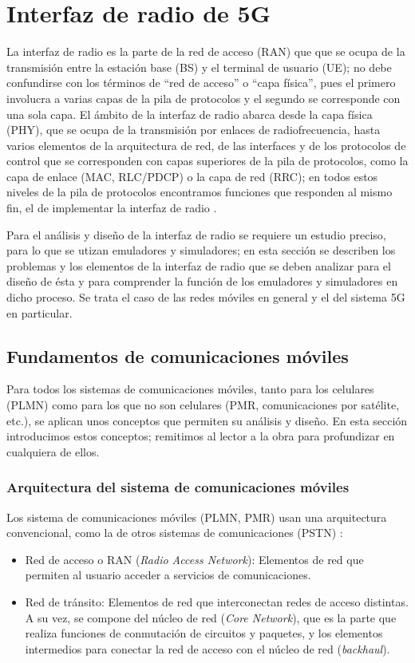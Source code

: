 \documentclass[12pt]{report} %
\begin{document}
\chapter{Interfaz de radio de 5G}

La interfaz de radio es la parte de la red de acceso (RAN) que que se ocupa de la transmisión entre la estación base (BS) y el terminal de usuario (UE);
no debe confundirse con los términos de ``red de acceso'' o ``capa física'',
pues el primero involucra a varias capas de la pila de protocolos y el segundo se corresponde con una sola capa.
El ámbito de la interfaz de radio abarca desde la capa física (PHY), que se ocupa de la transmisión por enlaces de radiofrecuencia,
hasta varios elementos de la arquitectura de red, de las interfaces y de los protocolos de control que  se corresponden con capas superiores de la pila de protocolos, como la capa de enlace (MAC, RLC/PDCP) o la capa de red (RRC);
en todos estos niveles de la pila de protocolos encontramos funciones que responden al mismo fin, el de implementar la interfaz de radio \cite{RefWorks:77}.

Para el análisis y diseño de la interfaz de radio se requiere un estudio preciso, para lo que se utizan emuladores y simuladores;
en esta sección se describen los problemas y los elementos de la interfaz de radio que se deben analizar para el diseño de ésta y para comprender la función de los emuladores y simuladores en dicho proceso.
Se trata el caso de las redes móviles en general y el del sistema 5G en particular.

\section{Fundamentos de comunicaciones móviles}

Para todos los sistemas de comunicaciones móviles, tanto para los celulares (PLMN) como para los que no son celulares (PMR, comunicaciones por satélite, etc.), se aplican unos conceptos que permiten su análisis y diseño.
En esta sección introducimos estos conceptos; remitimos al lector a la obra \cite{RefWorks:17} para profundizar en cualquiera de ellos.

\subsection{Arquitectura del sistema de comunicaciones móviles}

Los sistema de comunicaciones móviles (PLMN, PMR) usan una arquitectura convencional, como la de otros sistemas de comunicaciones (PSTN) \cite{RefWorks:77}:
\begin{itemize}
	\item Red de acceso o RAN (\textit{Radio Access Network}): Elementos de red que permiten al usuario acceder a servicios de comunicaciones.
	\item Red de tránsito: Elementos de red que interconectan redes de acceso distintas.
	A su vez, se compone del núcleo de red (\textit{Core Network}), que es la parte que realiza funciones de conmutación de circuitos y paquetes,
	y los elementos intermedios para conectar la red de acceso con el núcleo de red (\textit{backhaul}).
\end{itemize}
\end{document}
